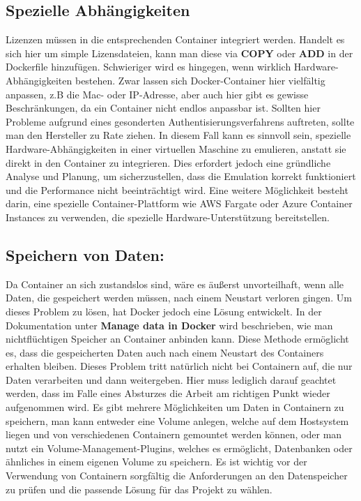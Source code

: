 \subsection{Spezielle Abhängigkeiten}
Lizenzen müssen in die entsprechenden Container integriert werden. Handelt es sich hier um simple Lizensdateien, kann man diese via \textbf{COPY} oder \textbf{ADD} in der Dockerfile hinzufügen.
Schwieriger wird es hingegen, wenn wirklich Hardware-Abhängigkeiten bestehen. Zwar lassen sich Docker-Container hier vielfältig anpassen, z.B die Mac- oder IP-Adresse, aber auch hier gibt es gewisse Beschränkungen, da ein Container nicht endlos anpassbar ist.
Sollten hier Probleme aufgrund eines gesonderten Authentisierungsverfahrens auftreten, sollte man den Hersteller zu Rate ziehen. In diesem Fall kann es sinnvoll sein, spezielle Hardware-Abhängigkeiten in einer virtuellen Maschine zu emulieren, anstatt sie direkt in den Container zu integrieren.
Dies erfordert jedoch eine gründliche Analyse und Planung, um sicherzustellen, dass die Emulation korrekt funktioniert und die Performance nicht beeinträchtigt wird.
Eine weitere Möglichkeit besteht darin, eine spezielle Container-Plattform wie AWS Fargate oder Azure Container Instances zu verwenden, die spezielle Hardware-Unterstützung bereitstellen.

\subsection{Speichern von Daten:}
Da Container an sich zustandslos sind, wäre es äußerst unvorteilhaft, wenn alle Daten, die gespeichert werden müssen, nach einem Neustart verloren gingen.
Um dieses Problem zu lösen, hat Docker jedoch eine Lösung entwickelt. In der Dokumentation unter \textbf{Manage data in Docker} \cite{dockerrstorage} wird beschrieben, wie man nichtflüchtigen Speicher an Container anbinden kann. Diese Methode ermöglicht es, dass die gespeicherten Daten auch nach einem Neustart des Containers erhalten bleiben. Dieses Problem tritt natürlich nicht bei Containern auf, die nur Daten verarbeiten und dann weitergeben. Hier muss lediglich darauf geachtet werden, dass im Falle eines Absturzes die Arbeit am richtigen Punkt wieder aufgenommen wird. Es gibt mehrere Möglichkeiten um Daten in Containern zu speichern, man kann entweder eine Volume anlegen, welche auf dem Hostsystem liegen und von verschiedenen Containern gemountet werden können, oder man nutzt ein Volume-Management-Plugins, welches es ermöglicht, Datenbanken oder ähnliches in einem eigenen Volume zu speichern. Es ist wichtig vor der Verwendung von Containern sorgfältig die Anforderungen an den Datenspeicher zu prüfen und die passende Lösung für das Projekt zu wählen.

